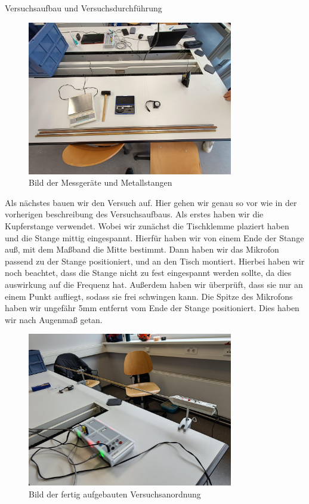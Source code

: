 \documentclass[twoside]{protokoll}
\begin{document}
\begin{aufgabe}{Versuchsaufbau und Versuchsdurchführung}
\begin{figure}[H]
  \centering
  \includegraphics[width=0.8\textwidth]{Bilder/434170_428396_1A3_Materialien.pdf}
  \caption{Bild der Messgeräte und Metallstangen}
  \centering
\end{figure}

Als nächstes bauen wir den Versuch auf. Hier gehen wir genau so vor wie in der vorherigen beschreibung des Versuchsaufbaus. Als erstes haben wir die Kupferstange verwendet.
Wobei wir zunächst die Tischklemme plaziert haben und die Stange mittig eingespannt. Hierfür haben wir von einem Ende der Stange auß, mit dem Maßband die Mitte bestimmt. Dann haben wir das Mikrofon passend zu der Stange positioniert, und an den Tisch montiert. Hierbei haben wir noch beachtet, dass die Stange nicht zu fest eingespannt werden sollte, da dies auswirkung auf die Frequenz hat. Außerdem haben wir überprüft, dass sie nur an einem Punkt aufliegt, sodass sie frei schwingen kann. Die Spitze des Mikrofons haben wir ungefähr 5mm entfernt vom Ende der Stange positioniert. Dies haben wir nach Augenmaß getan. 

\begin{figure}[H]
  \centering
  \includegraphics[width=0.8\textwidth]{Bilder/434170_428396_1A3_Gesamtaufbau.pdf}
  \caption{Bild der fertig aufgebauten Versuchsanordnung}
  \centering
\end{figure}


\end{aufgabe}
\end{document}
